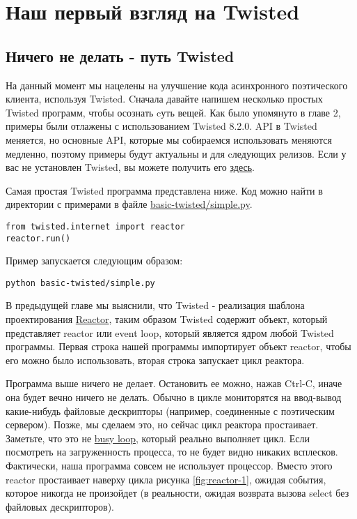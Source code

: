 

\section{Наш первый взгляд на Twisted\label{sec:part3}}

\subsection{Ничего не делать - путь Twisted}

На данный момент мы нацелены на улучшение кода  
асинхронного поэтического клиента,  
используя Twisted. Cначала давайте напишем 
несколько простых Twisted программ,  
чтобы осознать cуть вещей. Как было упомянуто в главе 2,  
примеры были отлажены с использованием Twisted 8.2.0. API 
в Twisted меняется, но основные API, которые мы собираемся использовать 
меняются медленно, поэтому примеры 
будут актуальны и для cледующих релизов. Если у вас не 
установлен Twisted, вы можете получить его 
\href{http://twistedmatrix.com/trac/wiki/Downloads}{здесь}.


Самая простая Twisted программа представлена ниже. Код можно 
найти в директории с примерами в файле    
\href{http://github.com/jdavisp3/twisted-intro/blob/master/basic-twisted/simple.py}{basic-twisted/simple.py}. 

 \begin{verbatim}
from twisted.internet import reactor
reactor.run()
\end{verbatim} 

Пример запускается следующим образом:

 \begin{verbatim}
python basic-twisted/simple.py
\end{verbatim} 

В предыдущей главе мы выяснили, что Twisted - реализация шаблона проектирования 
\href{http://en.wikipedia.org/wiki/Reactor\_pattern}{Reactor}, 
таким образом Twisted содержит объект, который представляет reactor или 
event loop, который является ядром любой Twisted программы. Первая строка 
нашей программы импортирует объект reactor, чтобы его можно было   
использовать, вторая строка запускает цикл реактора. 


Программа выше ничего не делает. Остановить ее можно, 
нажав Ctrl-C, иначе она будет вечно ничего не делать. 
Обычно в цикле мониторятся на ввод-вывод какие-нибудь 
файловые дескрипторы (например, соединенные с поэтическим 
сервером). Позже, мы сделаем это, но сейчас 
цикл реактора простаивает. Заметьте, что это не 
\href{http://en.wikipedia.org/wiki/Busy\_waiting}{busy loop}, 
который реально выполняет цикл. Если посмотреть 
на загруженность процесса, то не будет видно никаких 
всплесков. Фактически, наша программа совсем не использует 
процессор. Вместо этого reactor простаивает наверху 
цикла рисунка \ref{fig:reactor-1}, ожидая события, которое 
никогда не произойдет (в реальности, ожидая возврата 
вызова select без файловых дескрипторов).


